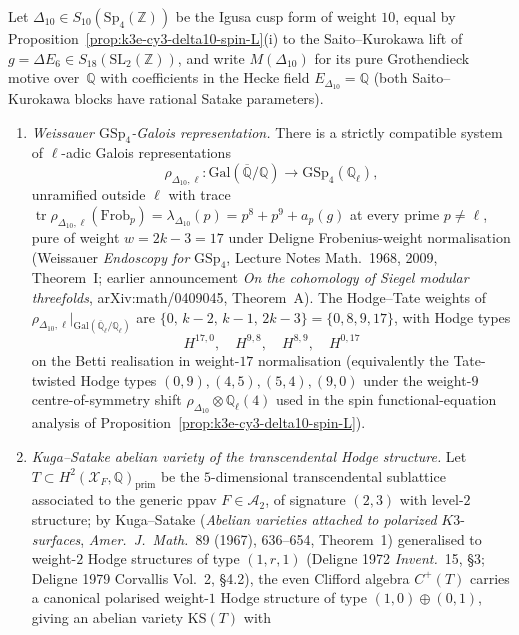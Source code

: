 \begin{theorem}[{Weissauer Kuga--Satake realisation of \texorpdfstring{$\rho_{\Delta_{10}}$}{rho-Delta-10} and Saito--Kurokawa \texorpdfstring{$[2]$}{[2]}-block \texorpdfstring{$=$}{=} Tate shift of \texorpdfstring{$h^1(\mathrm{KS}_T)^{\otimes 2}$}{h-1(KS-T)-(x) 2}}]
\label{thm:k3e-cy3-kuga-satake-weissauer-delta10}
Let $\Delta_{10} \in S_{10}(\mathrm{Sp}_4(\mathbb Z))$ be the Igusa cusp form of weight $10$, equal by Proposition~\ref{prop:k3e-cy3-delta10-spin-L}(i) to the Saito--Kurokawa lift of $g = \Delta E_6 \in S_{18}(\mathrm{SL}_2(\mathbb Z))$, and write $M(\Delta_{10})$ for its pure Grothendieck motive over~$\mathbb Q$ with coefficients in the Hecke field $E_{\Delta_{10}} = \mathbb Q$ (both Saito--Kurokawa blocks have rational Satake parameters).
\begin{enumerate}[label=\textup{(\roman*)},leftmargin=1.5em]
 \item \emph{Weissauer $\mathrm{GSp}_4$-Galois representation.} There is a strictly compatible system of $\ell$-adic Galois representations
 \[
 \rho_{\Delta_{10}, \ell} \colon \mathrm{Gal}(\overline{\mathbb Q}/\mathbb Q) \longrightarrow \mathrm{GSp}_4(\mathbb Q_\ell),
 \]
 unramified outside $\ell$ with trace $\operatorname{tr} \rho_{\Delta_{10}, \ell}(\mathrm{Frob}_p) = \lambda_{\Delta_{10}}(p) = p^8 + p^9 + a_p(g)$ at every prime $p \neq \ell$, pure of weight $w = 2k - 3 = 17$ under Deligne Frobenius-weight normalisation \textup{(}Weissauer \emph{Endoscopy for} $\mathrm{GSp}_4$, Lecture Notes Math.\ 1968, 2009, Theorem~I; earlier announcement \emph{On the cohomology of Siegel modular threefolds}, arXiv:math/0409045, Theorem~A\textup{)}. The Hodge--Tate weights of $\rho_{\Delta_{10}, \ell}|_{\mathrm{Gal}(\overline{\mathbb Q}_\ell/\mathbb Q_\ell)}$ are $\{0,\, k-2,\, k-1,\, 2k-3\} = \{0, 8, 9, 17\}$, with Hodge types
 \[
 H^{17,0}, \quad H^{9,8}, \quad H^{8,9}, \quad H^{0,17}
 \]
 on the Betti realisation in weight-$17$ normalisation \textup{(}equivalently the Tate-twisted Hodge types $(0,9), (4,5), (5,4), (9,0)$ under the weight-$9$ centre-of-symmetry shift $\rho_{\Delta_{10}} \otimes \mathbb Q_\ell(4)$ used in the spin functional-equation analysis of Proposition~\ref{prop:k3e-cy3-delta10-spin-L}\textup{)}.
 \item \emph{Kuga--Satake abelian variety of the transcendental Hodge structure.} Let $T \subset H^2(\mathcal X_F, \mathbb Q)_{\mathrm{prim}}$ be the $5$-dimensional transcendental sublattice associated to the generic ppav $F \in \mathcal A_2$, of signature $(2,3)$ with level-$2$ structure; by Kuga--Satake \textup{(}\emph{Abelian varieties attached to polarized} $K3$-\emph{surfaces}, \emph{Amer.\ J.\ Math.}\ 89 (1967), 636--654, Theorem~1\textup{)} generalised to weight-$2$ Hodge structures of type $(1, r, 1)$ \textup{(}Deligne 1972 \emph{Invent.}\ 15, \S 3; Deligne 1979 Corvallis Vol.\ 2, \S 4.2\textup{)}, the even Clifford algebra $C^+(T)$ carries a canonical polarised weight-$1$ Hodge structure of type $(1,0) \oplus (0,1)$, giving an abelian variety $\mathrm{KS}(T)$ with

\end{enumerate}
\end{theorem}
